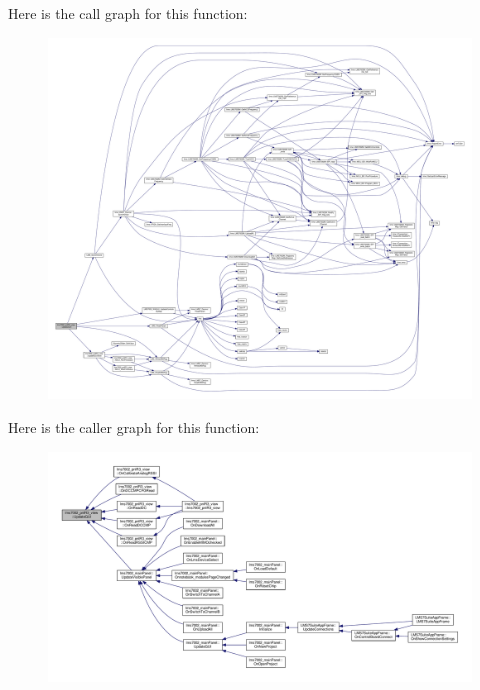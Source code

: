 Here is the call graph for this function\+:
\nopagebreak
\begin{figure}[H]
\begin{center}
\leavevmode
\includegraphics[width=350pt]{d5/d55/classlms7002__pnlR3__view_a1ef4dc35f280d8e3999104436d286365_cgraph}
\end{center}
\end{figure}




Here is the caller graph for this function\+:
\nopagebreak
\begin{figure}[H]
\begin{center}
\leavevmode
\includegraphics[width=350pt]{d5/d55/classlms7002__pnlR3__view_a1ef4dc35f280d8e3999104436d286365_icgraph}
\end{center}
\end{figure}


